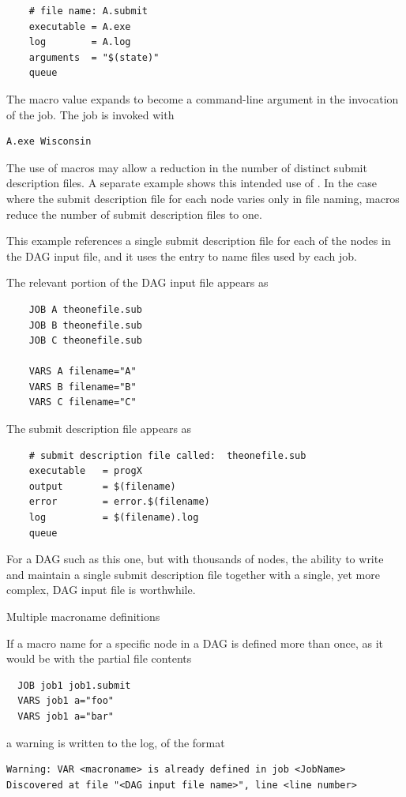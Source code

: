 \footnotesize
\begin{verbatim}
    # file name: A.submit
    executable = A.exe
    log        = A.log
    arguments  = "$(state)"
    queue
\end{verbatim}
\normalsize
The macro value expands to become a command-line argument in 
the invocation of the job.
The job is invoked with
\footnotesize
\begin{verbatim}
A.exe Wisconsin
\end{verbatim}
\normalsize

The use of macros may allow a reduction in the number 
of distinct submit description files.
A separate example shows this intended use of .
In the case where the submit description file for each node
varies only in file naming, 
macros reduce the number of submit description files to one.

This example references a single submit description file for each of
the nodes in the DAG input file, 
and it uses the  entry to name files used by each job.

The relevant portion of the DAG input file appears as 
\begin{verbatim}
    JOB A theonefile.sub
    JOB B theonefile.sub
    JOB C theonefile.sub

    VARS A filename="A"
    VARS B filename="B"
    VARS C filename="C"
\end{verbatim}

The submit description file appears as 
\footnotesize
\begin{verbatim}
    # submit description file called:  theonefile.sub
    executable   = progX
    output       = $(filename)
    error        = error.$(filename)
    log          = $(filename).log
    queue
\end{verbatim}
\normalsize

For a DAG such as this one, but with thousands of nodes,
the ability to write and maintain a single submit description file 
together with a single, yet more complex, DAG input file is worthwhile.

\begin{description}
\item[Multiple macroname definitions]
\end{description}

If a macro name for a specific node in a DAG is defined more than once,
as it would be with the partial file contents
\begin{verbatim}
  JOB job1 job1.submit
  VARS job1 a="foo"
  VARS job1 a="bar"
\end{verbatim}
a warning is written to the log, of the format 
\begin{verbatim}
Warning: VAR <macroname> is already defined in job <JobName>
Discovered at file "<DAG input file name>", line <line number>
\end{verbatim}

